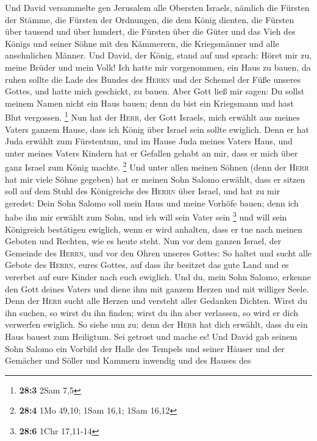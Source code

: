 Und David versammelte gen Jerusalem alle Obersten
Israels, nämlich die Fürsten der Stämme, die Fürsten der Ordnungen, die
dem König dienten, die Fürsten über tausend und über hundert, die
Fürsten über die Güter und das Vieh des Königs und seiner Söhne mit den
Kämmerern, die Kriegsmänner und alle ansehnlichen Männer. 
Und David, der König, stand auf und sprach: Höret mir zu, meine Brüder
und mein Volk! Ich hatte mir vorgenommen, ein Haus zu bauen, da ruhen
sollte die Lade des Bundes des \textsc{Herrn} und der Schemel der Füße
unseres Gottes, und hatte mich geschickt, zu bauen.  Aber
Gott ließ mir sagen: Du sollst meinem Namen nicht ein Haus bauen; denn
du bist ein Kriegsmann und hast Blut vergossen. \footnote{\textbf{28:3}
  2Sam 7,5}  Nun hat der \textsc{Herr}, der Gott Israels,
mich erwählt aus meines Vaters ganzem Hause, dass ich König über Israel
sein sollte ewiglich. Denn er hat Juda erwählt zum Fürstentum, und im
Hause Juda meines Vaters Haus, und unter meines Vaters Kindern hat er
Gefallen gehabt an mir, dass er mich über ganz Israel zum König machte.
\footnote{\textbf{28:4} 1Mo 49,10; 1Sam 16,1; 1Sam 16,12} 
Und unter allen meinen Söhnen (denn der \textsc{Herr} hat mir viele
Söhne gegeben) hat er meinen Sohn Salomo erwählt, dass er sitzen soll
auf dem Stuhl des Königreichs des \textsc{Herrn} über Israel,
 und hat zu mir geredet: Dein Sohn Salomo soll mein Haus
und meine Vorhöfe bauen; denn ich habe ihn mir erwählt zum Sohn, und ich
will sein Vater sein \footnote{\textbf{28:6} 1Chr 17,11-14}
 und will sein Königreich bestätigen ewiglich, wenn er
wird anhalten, dass er tue nach meinen Geboten und Rechten, wie es heute
steht.  Nun vor dem ganzen Israel, der Gemeinde des
\textsc{Herrn}, und vor den Ohren unseres Gottes: So haltet und sucht
alle Gebote des \textsc{Herrn}, eures Gottes, auf dass ihr besitzet das
gute Land und es vererbet auf eure Kinder nach euch ewiglich.
 Und du, mein Sohn Salomo, erkenne den Gott deines Vaters
und diene ihm mit ganzem Herzen und mit williger Seele. Denn der
\textsc{Herr} sucht alle Herzen und versteht aller Gedanken Dichten.
Wirst du ihn suchen, so wirst du ihn finden; wirst du ihn aber
verlassen, so wird er dich verwerfen ewiglich.  So siehe
nun zu; denn der \textsc{Herr} hat dich erwählt, dass du ein Haus bauest
zum Heiligtum. Sei getrost und mache es!  Und David gab
seinem Sohn Salomo ein Vorbild der Halle des Tempels und seiner Häuser
und der Gemächer und Söller und Kammern inwendig und des Hauses des
